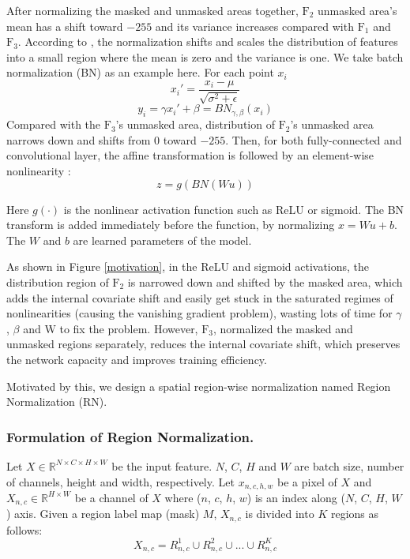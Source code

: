 \documentclass[letterpaper]{article} %
\begin{document}
After normalizing the masked and unmasked areas together, $\text{F}_2$ unmasked area's mean has a shift toward $-255$ and its variance increases compared with $\text{F}_1$ and $\text{F}_3$. According to \cite{ioffe2015batch}, the normalization shifts and scales the distribution of features into a small region where the mean is zero and the variance is one. We take batch normalization (BN) as an example here.
For each point $x_i$
\begin{equation}
{x_i'}={\frac{x_i-\mu}{\sqrt{\sigma^2+\epsilon}}}
\end{equation}
\begin{equation}
{y_i}={\gamma x_i'+\beta}={BN_{\gamma,\beta}(x_i)}
\end{equation}
Compared with the $\text{F}_3$'s unmasked area, distribution of $\text{F}_2$'s unmasked area narrows down and shifts from $0$ toward $-255$.
Then, for both fully-connected and convolutional layer, the affine transformation is followed by an element-wise nonlinearity \cite{ioffe2015batch}:
\begin{equation}
{z}={g(BN(Wu))}
\end{equation}

Here $g(\cdot)$ is the nonlinear activation function such as ReLU or sigmoid. The BN transform is added immediately before the function, by normalizing $x = W u + b$. The $W$ and $b$ are learned parameters of the model.

As shown in Figure \ref{motivation}, in the ReLU and sigmoid activations, the distribution region of $\text{F}_2$ is narrowed down and shifted by the masked area, which adds the internal covariate shift and easily get stuck in the saturated regimes of nonlinearities (causing the vanishing gradient problem), wasting lots of time for $\gamma$, $\beta$ and W to fix the problem. However, $\text{F}_3$, normalized the masked and unmasked regions separately, reduces the internal covariate shift, which preserves the network capacity and improves training efficiency.

Motivated by this, we design a spatial region-wise normalization named Region Normalization (RN).


\subsubsection{Formulation of Region Normalization.}
Let $X \in \mathbb{R}^{N \times C \times H \times W}$ be the input feature. $N$, $C$, $H$ and $W$ are batch size, number of channels, height and width, respectively. Let $x_{n,c,h,w}$ be a pixel of $X$ and $X_{n,c} \in \mathbb{R}^{H \times W}$ be a channel of $X$ where ($n$, $c$, $h$, $w$) is an index along ($N$, $C$, $H$, $W$) axis. Given a region label map (mask) $M$, $X_{n,c}$ is divided into $K$ regions as follows:
\begin{equation}
X_{n,c}=R_{n,c}^{1} \cup R_{n,c}^{2} \cup ... \cup R_{n,c}^{K}
\end{equation}
\end{document}
